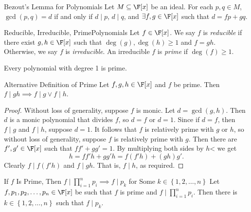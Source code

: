 \documentclass[linearalgebraII]{subfiles}
\begin{document}
    \begin{theorem}{Bezout's Lemma for Polynomials}
        Let $M\subseteq \F[x]$ be an ideal. For each $p,q\in M$, $\gcd(p,q) = d$ if and only if $d\mid p$, $d\mid q$, and $\exists f,g\in \F[x]$ such that $d = fp+gq$.
    \end{theorem}

    \begin{definition}{Reducible, Irreducible, Prime}{Polynomials}
        Let $f\in \F[x]$. We say $f$ is \emph{reducible} if there exist $g,h\in \F[x]$ such that $\deg(g), \deg(h)\geq 1$ and $f=gh$. Otherwise, we say $f$ is \emph{irreducible}. An irreducible $f$ is \emph{prime} if $\deg(f)\geq 1$.
    \end{definition}

    \begin{remark}
        Every polynomial with degree 1 is prime.
    \end{remark}

    \begin{prop}{Alternative Definition of Prime}
        Let $f,g,h\in \F[x]$ and $f$ be prime. Then $f\mid gh \implies f\mid g \lor f\mid h$.
    \end{prop}

    \begin{proof}
        Without loss of generality, suppose $f$ is monic. Let $d=\gcd(g,h)$. Then $d$ is a monic polynomial that divides $f$, so $d=f$ or $d=1$. Since if $d=f$, then $f\mid g$ and $f\mid h$, suppose $d=1$. It follows that $f$ is relatively prime with $g$ or $h$, so without loss of generality, suppose $f$ is relatively prime with $g$. Then there are $f', g'\in \F[x]$ such that $ff'+gg'=1$. By multiplying both sides by $h$< we get
        \begin{equation*}
            h = ff'h + gg'h = f(f'h) + (gh)g'.
        \end{equation*}
        Clearly $f\mid f(f'h)$ and $f\mid gh$. That is, $f\mid h$, as required.
    \end{proof}

    \begin{cor}{If $f$ Is Prime, Then $f\mid \prod^n_{i=1} p_i \implies f\mid p_k$ for Some $k\in \left\lbrace 1, 2, \ldots, n \right\rbrace $}
        Let $f, p_1, p_2, \ldots, p_n\in \F[x]$ be such that $f$ is prime and $f\mid \prod^n_{i=1} p_i$. Then there is $k\in \left\lbrace 1, 2, \ldots, n \right\rbrace$ such that $f\mid p_k$.
    \end{cor}	
\end{document}
